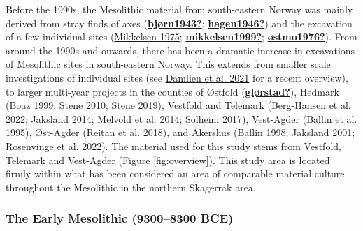 \documentclass[
  a4paper,
  oneside]{uiophdthesis}
\begin{document}
Before the 1990s, the Mesolithic material from south-eastern Norway was mainly derived from stray finds of axes (\protect\hyperlink{ref-bjuxf8rn1943}{\textbf{bjørn1943?}}; \protect\hyperlink{ref-hagen1946}{\textbf{hagen1946?}}) and the excavation of a few individual sites (\protect\hyperlink{ref-mikkelsen1975}{Mikkelsen 1975}; \protect\hyperlink{ref-mikkelsen1999}{\textbf{mikkelsen1999?}}; \protect\hyperlink{ref-uxf8stmo1976}{\textbf{østmo1976?}}). From around the 1990s and onwards, there has been a dramatic increase in excavations of Mesolithic sites in south-eastern Norway. This extends from smaller scale investigations of individual sites (see \protect\hyperlink{ref-damlien2021}{Damlien et al. 2021} for a recent overview), to larger multi-year projects in the counties of Østfold (\protect\hyperlink{ref-gluxf8rstad}{\textbf{glørstad?}}), Hedmark (\protect\hyperlink{ref-boaz1999}{Boaz 1999}; \protect\hyperlink{ref-stene2010}{Stene 2010}; \protect\hyperlink{ref-stene2019}{Stene 2019}), Vestfold and Telemark (\protect\hyperlink{ref-berg-hansen2022}{Berg-Hansen et al. 2022}; \protect\hyperlink{ref-jaksland2014}{Jaksland 2014}; \protect\hyperlink{ref-melvold2014b}{Melvold et al. 2014}; \protect\hyperlink{ref-solheim2017b}{Solheim 2017}), Vest-Agder (\protect\hyperlink{ref-ballin1995}{Ballin et al. 1995}), Øst-Agder (\protect\hyperlink{ref-reitan2018c}{Reitan et al. 2018}), and Akershus (\protect\hyperlink{ref-ballin1998}{Ballin 1998}; \protect\hyperlink{ref-jaksland2001}{Jaksland 2001}; \protect\hyperlink{ref-rosenvinge2022}{Rosenvinge et al. 2022}). The material used for this study stems from Vestfold, Telemark and Vest-Agder (Figure \ref{fig:overview}). This study area is located firmly within what has been considered an area of comparable material culture throughout the Mesolithic in the northern Skagerrak area.

\hypertarget{the-early-mesolithic-93008300-bce}{%
\subsubsection{The Early Mesolithic (9300--8300 BCE)}\label{the-early-mesolithic-93008300-bce}}
\end{document}
